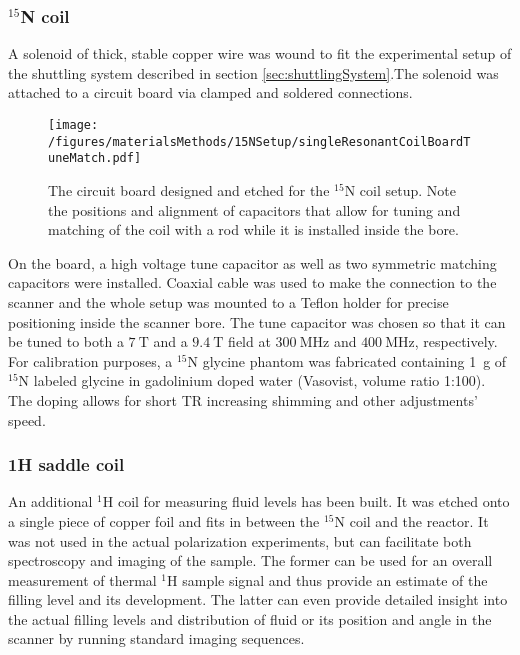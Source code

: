            \subsubsection{$^{15}$N coil}
            \label{sec:matMeth:15Ncoil}
            A solenoid of thick, stable copper wire was wound to fit the experimental setup of the shuttling system described in section \ref{sec:shuttlingSystem}.The solenoid was attached to a circuit board via clamped and soldered connections.
                \begin{wrapfigure}{rb}{0.5\textwidth}
                    \label{figure:matMeth:15NcircuitBoard}
                    \texttt{[image: /figures/materialsMethods/15NSetup/singleResonantCoilBoardTuneMatch.pdf]}
                    \caption[$^{15}$N circuit board]{The circuit board designed and etched for the $^{15}$N coil setup. Note the positions and alignment of capacitors that allow for tuning and matching of the coil with a rod while it is installed inside the bore.}
                \end{wrapfigure}
                  On the board, a high voltage tune capacitor as well as two symmetric matching capacitors were installed. Coaxial cable was used to make the connection to the scanner and the whole setup was mounted to a Teflon holder for precise positioning inside the scanner bore. The tune capacitor was chosen so that it can be tuned to both a $\SI{7}{\tesla}$ and a $\SI{9.4}{\tesla}$ field at $\SI{300}{\MHz}$ and $\SI{400}{\MHz}$, respectively.
                For calibration purposes, a $^{15}$N glycine phantom was fabricated containing \SI{1}{\gram} of $^{15}$N labeled glycine in gadolinium  doped water (Vasovist, volume ratio 1:100). The doping allows for short TR increasing shimming and other adjustments' speed.
            \subsubsection{1H saddle coil} 
            An additional $^{1}$H coil for measuring fluid levels has been built. It was etched onto a single piece of copper foil and fits in between the $^{15}$N coil and the reactor. It was not used in the actual polarization experiments, but can facilitate both spectroscopy and imaging of the sample. The former can be used for an overall measurement of thermal $^{1}$H sample signal and thus provide an estimate of the filling level and its development. The latter can even provide detailed insight into the actual filling levels and distribution of fluid or its position and angle in the scanner by running standard imaging sequences.

